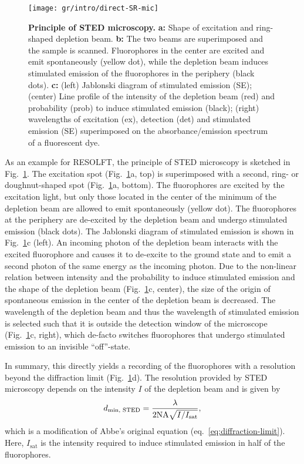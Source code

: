 \begin{figure}
  \centering
  \texttt{[image: gr/intro/direct-SR-mic]}
  \caption{\textbf{Principle of STED microscopy.} \textbf{a:} Shape of
    excitation and ring-shaped depletion beam. \textbf{b:} The two beams are
    superimposed and the sample is scanned. Fluorophores in the center are
    excited and emit spontaneously (yellow dot), while the depletion beam
    induces stimulated emission of the fluorophores in the periphery (black
    dots). \textbf{c:} (left) Jablonski diagram of stimulated emission (SE);
    (center) Line profile of the intensity of the depletion beam (red) and
    probability (prob) to induce stimulated emission (black); (right)
    wavelengths of excitation (ex), detection (det) and stimulated emission
    (SE) superimposed on the absorbance/emission spectrum of a fluorescent
    dye.}
  \label{fig:STED-principle}
\end{figure}

As an example for RESOLFT, the principle of STED microscopy is sketched in
Fig.~\ref{fig:STED-principle}. The excitation spot
(Fig.~\ref{fig:STED-principle}a, top) is superimposed with a second, ring- or
doughnut-shaped spot (Fig.~\ref{fig:STED-principle}a, bottom). The
fluorophores are excited by the excitation light, but only those located in
the center of the minimum of the depletion beam are allowed to emit
spontaneously (yellow dot). The fluorophores at the periphery are de-excited
by the depletion beam and undergo stimulated emission (black dots). The
Jablonski diagram of stimulated emission is shown in
Fig.~\ref{fig:STED-principle}c (left). An incoming photon of the depletion
beam interacts with the excited fluorophore and causes it to de-excite to the
ground state and to emit a second photon of the same energy as the incoming
photon. Due to the non-linear relation between intensity and the probability
to induce stimulated emission and the shape of the depletion beam
(Fig.~\ref{fig:STED-principle}c, center), the size of the origin of
spontaneous emission in the center of the depletion beam is decreased. The
wavelength of the depletion beam and thus the wavelength of stimulated
emission is selected such that it is outside the detection window of the
microscope (Fig.~\ref{fig:STED-principle}c, right), which de-facto switches
fluorophores that undergo stimulated emission to an invisible ``off''-state.

In summary, this directly yields a recording of the fluorophores with a
resolution beyond the diffraction limit (Fig.~\ref{fig:STED-principle}d). The
resolution provided by STED microscopy depends on the intensity $I$ of the
depletion beam and is given by
\begin{equation}
  d_\text{min, STED} = \frac\lambda{2\mathrm{NA}\sqrt{I/I_\text{sat}}}\text,
  \label{eq:resolution-STED}
\end{equation}
which is a modification of Abbe's original equation
(eq.~\eqref{eq:diffraction-limit}). Here, $I_\text{sat}$ is the intensity
required to induce stimulated emission in half of the fluorophores.

